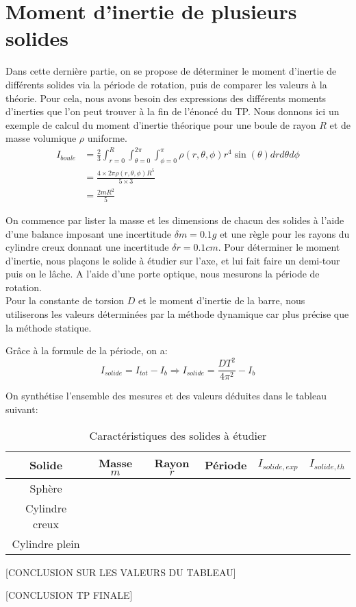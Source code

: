 \documentclass[12pt]{article}
\begin{document}
\section{Moment d'inertie de plusieurs solides}
Dans cette dernière partie, on se propose de déterminer le moment d'inertie de différents solides via la période
de rotation, puis de comparer les valeurs à la théorie. Pour cela, nous avons besoin des expressions des différents moments d'inerties que l'on peut trouver à la fin de l'énoncé
du TP. Nous donnons ici un exemple de calcul du moment d'inertie théorique pour une boule de rayon $R$ et de masse volumique $\rho$ uniforme.
\begin{align}
    I_{boule}   & = \frac{2}{3} \int_{r=0}^{R}\int_{\theta=0}^{2\pi}\int_{\phi=0}^{\pi} \rho(r,\theta,\phi) r^4 \sin(\theta) dr d\theta d\phi \\
                & = \frac{4 \times 2\pi \rho(r,\theta,\phi) R^5}{5 \times 3} \\
                & = \frac{2mR^2}{5}
\end{align}

On commence par lister la masse et les dimensions de chacun des solides à l'aide d'une balance imposant une incertitude $\delta m = 0.1g$
et une règle pour les rayons du cylindre creux donnant une incertitude $\delta r = 0.1cm$. Pour déterminer le moment d'inertie, nous plaçons le solide à étudier sur l'axe, et lui fait faire un demi-tour puis on le lâche. A l'aide d'une porte optique,
nous mesurons la période de rotation. \\ 
Pour la constante de torsion $D$ et le moment d'inertie de la barre, nous utiliserons les valeurs déterminées par la méthode dynamique car plus précise que la méthode
statique.

Grâce à la formule de la période, on a:
\begin{equation}
    I_{solide} = I_{tot} - I_b \Rightarrow I_{solide} = \frac{DT^2}{4\pi^2} - I_b
\end{equation}

On synthétise l'ensemble des mesures et des valeurs déduites dans le tableau suivant:

\begin{table}[h!]
	\centering
	\begin{tabular}{||c c c c c c||} 
		\hline
		Solide          & Masse $m$  & Rayon $r$  & Période & $I_{solide,exp}$ & $I_{solide,th}$    \\
		\hline
        Sphère          &            &          &           &                  &                    \\
        Cylindre creux  &            &          &           &                  &                    \\
        Cylindre plein  &            &          &           &                  &                    \\
		\hline
	\end{tabular}
	\caption{Caractéristiques des solides à étudier}
	\label{table:1}
\end{table}

[CONCLUSION SUR LES VALEURS DU TABLEAU]

[CONCLUSION TP FINALE]
\end{document}
